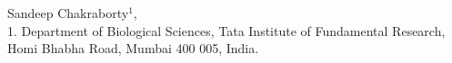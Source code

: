 Sandeep Chakraborty$^{1}$,
\\
1. Department of Biological Sciences, Tata Institute of Fundamental Research, Homi Bhabha Road, Mumbai 400 005, India. \\
